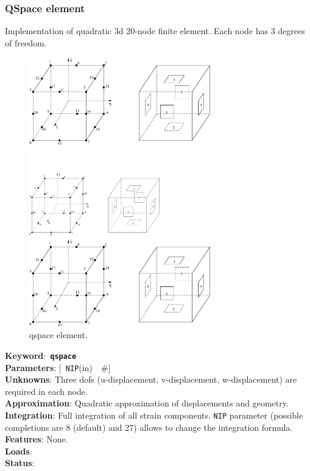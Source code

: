 \documentclass[a4paper]{article}
\newcommand{\descitem}[1]{{\noindent \bf #1}:}
\newcommand{\elemkeyword}[1]{\descitem{Keyword}~{\bf \texttt{#1}}}
\newcommand{\elemparam}[2]{{{\texttt{#1}\tiny (#2)}~~\#}}
\newcommand{\optelemparam}[2]{{[~\elemparam{#1}{#2}]}}
\newcommand{\param}[1]{{\texttt{#1}}}
\begin{document}
\subsubsection{QSpace element}
Implementation of quadratic 3d  20-node 
finite element. Each node has 3 degrees of freedom.
\begin{figure}[tb]
\begin{htmlonly}
  \centerline{\includegraphics[width=0.7\textwidth]{hexa_quad.eps}}
\end{htmlonly}
\ifpdf
 \centerline{\includegraphics[width=0.7\textwidth]{hexa_quad.pdf}}
\else
 \centerline{\includegraphics[width=0.7\textwidth]{hexa_quad.eps}}
\fi
\caption{qspace element.}
\end{figure}

\elemkeyword{qspace}\\
\descitem{Parameters} \optelemparam{NIP}{in}\\
\descitem{Unknowns}
Three dofs (u-displacement, v-displacement, w-displacement) are required in each node.\\
\descitem{Approximation} Quadratic approximation of displacements and
geometry.\\
\descitem{Integration}
Full integration of all strain components.
\param{NIP} parameter (possible completions are 8 (default) and 27)
allows to change the integration formula.\\
\descitem{Features} None.\\
\descitem{Loads} \\
\descitem{Status} 
\end{document}
